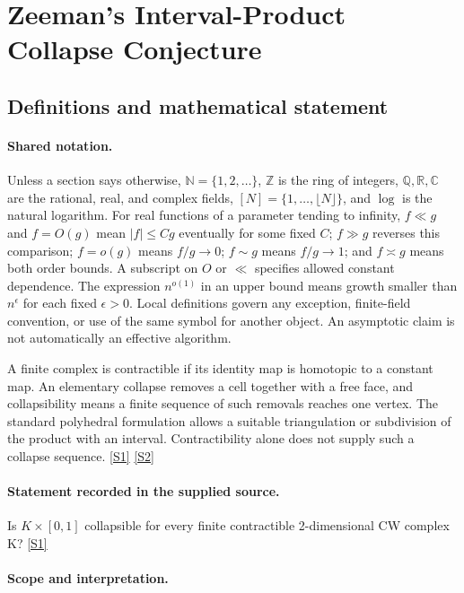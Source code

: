 \documentclass[11pt,a4paper]{article}
\newcommand{\N}{\mathbb{N}}
\newcommand{\Z}{\mathbb{Z}}
\newcommand{\Q}{\mathbb{Q}}
\newcommand{\R}{\mathbb{R}}
\newcommand{\C}{\mathbb{C}}
\newcommand{\sref}[2]{\hyperlink{source:#1:#2}{[S#2]}}
\begin{document}
\section{Zeeman’s Interval-Product Collapse Conjecture}\label{statement}


\subsection{Definitions and mathematical statement}

\paragraph{Shared notation.}Unless a section says otherwise, $\N=\{1,2,\ldots\}$,
$\Z$ is the ring of integers, $\Q,\R,\C$ are the rational, real, and complex
fields, $[N]=\{1,\ldots,\lfloor N\rfloor\}$, and $\log$ is the natural
logarithm. For real functions of a parameter tending to infinity,
$f\ll g$ and $f=O(g)$ mean $|f|\leq Cg$ eventually for some fixed $C$;
$f\gg g$ reverses this comparison; $f=o(g)$ means $f/g\to0$;
$f\sim g$ means $f/g\to1$; and $f\asymp g$ means both order bounds.
A subscript on $O$ or $\ll$ specifies allowed constant dependence.
The expression $n^{o(1)}$ in an upper bound means growth smaller than
$n^\epsilon$ for each fixed $\epsilon>0$. Local definitions govern any
exception, finite-field convention, or use of the same symbol for another
object. An asymptotic claim is not automatically an effective algorithm.



A finite complex is contractible if its identity map is homotopic to a constant map. An elementary collapse removes a cell together with a free face, and collapsibility means a finite sequence of such removals reaches one vertex. The standard polyhedral formulation allows a suitable triangulation or subdivision of the product with an interval. Contractibility alone does not supply such a collapse sequence. \sref{statement}{1} \sref{statement}{2}

\paragraph{Statement recorded in the supplied source.}
Is $K \times [0,1]$ collapsible for every finite contractible 2-dimensional CW complex K? \sref{statement}{1}

\paragraph{Scope and interpretation.}
\end{document}
